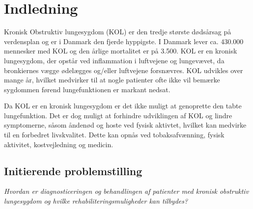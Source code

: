 \chapter{Indledning} 
Kronisk Obstruktiv lungesygdom (KOL) er den tredje største dødsårsag på verdensplan og er i Danmark den fjerde hyppigste. I Danmark lever ca. 430.000 mennesker med KOL og den årlige mortalitet er på 3.500. KOL er en kronisk lungesygdom, der opstår ved inflammation i luftvejene og lungevævet, da bronkiernes vægge ødelægges og/eller luftvejene forsnævres. KOL udvikles over mange år, hvilket medvirker til at nogle patienter ofte ikke vil bemærke sygdommen førend lungefunktionen er markant nedsat. 

Da KOL er en kronisk lungesygdom er det ikke muligt at genoprette den tabte lungefunktion. Det er dog muligt at forhindre udviklingen af KOL og lindre symptomerne, såsom åndenød og hoste ved fysisk aktivtet, hvilket kan medvirke til en forbedret livskvalitet. Dette kan opnås ved tobaksafvænning, fysisk aktivitet, kostvejledning og medicin. 






\section{Initierende problemstilling}
\textit{Hvordan er diagnosticeringen og behandlingen af patienter med kronisk obstruktiv lungesygdom og hvilke rehabiliteringsmuligheder kan tilbydes?}